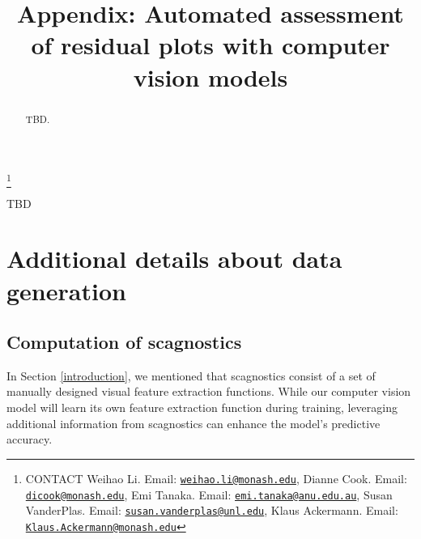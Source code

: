 \documentclass[]{interact}
\theoremstyle{plain}%
\theoremstyle{definition}
\theoremstyle{remark}
\begin{document}

\title{Appendix: Automated assessment of residual plots with computer
vision models}


\author{
}

\thanks{CONTACT Weihao
Li. Email: \href{mailto:weihao.li@monash.edu}{\nolinkurl{weihao.li@monash.edu}}, Dianne
Cook. Email: \href{mailto:dicook@monash.edu}{\nolinkurl{dicook@monash.edu}}, Emi
Tanaka. Email: \href{mailto:emi.tanaka@anu.edu.au}{\nolinkurl{emi.tanaka@anu.edu.au}}, Susan
VanderPlas. Email: \href{mailto:susan.vanderplas@unl.edu}{\nolinkurl{susan.vanderplas@unl.edu}}, Klaus
Ackermann. Email: \href{mailto:Klaus.Ackermann@monash.edu}{\nolinkurl{Klaus.Ackermann@monash.edu}}}

\maketitle

\begin{abstract}
TBD.
\end{abstract}

\begin{keywords}
TBD
\end{keywords}

\section{Additional details about data
generation}\label{additional-details-about-data-generation}

\subsection{Computation of
scagnostics}\label{computation-of-scagnostics}

In Section \ref{introduction}, we mentioned that scagnostics consist of
a set of manually designed visual feature extraction functions. While
our computer vision model will learn its own feature extraction function
during training, leveraging additional information from scagnostics can
enhance the model's predictive accuracy.
\end{document}
